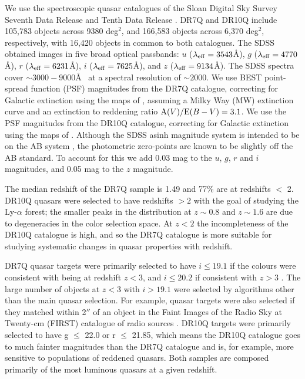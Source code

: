 We use the spectroscopic quasar catalogues of the Sloan Digital Sky Survey \citep[SDSS;][]{york00} Seventh Data Release \citep[DR7Q;][]{schneider10} and Tenth Data Release \citep[DR10Q;][]{paris14}. 
DR7Q and DR10Q include 105,783 objects across 9380 deg$^2$, and 166,583 objects across 6,370 deg$^2$, respectively, with 16,420 objects in common to both catalogues. 
The SDSS obtained images in five broad optical passbands: $u$ ($\lambda_{\rm eff} = 3543$\AA), $g$ ($\lambda_{\rm eff} = 4770$\AA), $r$ ($\lambda_{\rm eff} = 6231$\AA), $i$ ($\lambda_{\rm eff} = 7625$\AA), and $z$ ($\lambda_{\rm eff} = 9134$\AA). 
The SDSS spectra cover $\sim 3000 - 9000$\AA~ at a spectral resolution of $\sim 2000$. 
We use BEST point-spread function (PSF) magnitudes from the DR7Q catalogue, correcting for Galactic extinction using the maps of \citet{schlegel98}, assuming a Milky Way (MW) extinction curve \citep{pei92} and an extinction to reddening ratio ${\rm A}(V) / {\rm E}(B-V) = 3.1$. 
We use the PSF magnitudes from the DR10Q catalogue, correcting for Galactic extinction using the maps of \citet{schlafly11}. 
Although the SDSS asinh magnitude system is intended to be on the AB system \citep{oke83}, the photometric zero-points are known to be slightly off the AB standard. 
To account for this we add 0.03 mag to the $u$, $g$, $r$ and $i$ magnitudes, and 0.05 mag to the $z$ magnitude.  

The median redshift of the DR7Q sample is 1.49 and 77\% are at redshifts $<$ 2. 
DR10Q quasars were selected to have redshifts $>2$ with the goal of studying the Ly-$\alpha$ forest; the smaller peaks in the distribution at $z \sim 0.8$ and $z \sim 1.6$ are due to degeneracies in the color selection space. At $z<2$ the incompleteness of the DR10Q catalogue is high, and so the DR7Q catalogue is more suitable for studying systematic changes in quasar properties with redshift. 

DR7Q quasar targets were primarily selected to have $i \leq 19.1$ if the colours were consistent with being at redshift $z < 3$, and $i \leq 20.2$ if consistent with $z > 3$ \citep{richards02}. 
The large number of objects at $z < 3$ with $i > 19.1$ were selected by algorithms other than the main quasar selection. 
For example, quasar targets were also selected if they matched within 2$''$ of an object in the Faint Images of the Radio Sky at Twenty-cm (FIRST) catalogue of radio sources \citep{becker95}. 
DR10Q targets were primarily selected to have g $\leq$ 22.0 or r $\leq$ 21.85, which means the DR10Q catalogue goes to much fainter magnitudes than the DR7Q catalogue and is, for example, more sensitive to populations of reddened quasars. 
Both samples are composed primarily of the most luminous quasars at a given redshift. 


